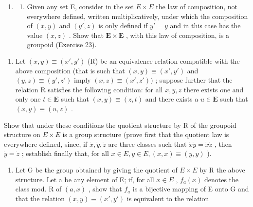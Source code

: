 \begin{enumerate}
\def\labelenumi{\arabic{enumi}.}
\setcounter{enumi}{23}
\tightlist
\item
  \begin{enumerate}
  \def\labelenumii{(\alph{enumii})}
  \tightlist
  \item
    Given any set E, consider in the set \(E \times E\) the law of composition, not everywhere defined, written multiplicatively, under which the composition of \((x, y)\) and \((y', z)\) is only defined if \(y' = y\) and in this case has the value \((x, z)\) . Show that \(\mathbf{E} \times \mathbf{E}\) , with this law of composition, is a groupoid (Exercise 23).
  \end{enumerate}
\end{enumerate}

\begin{enumerate}
\def\labelenumi{(\alph{enumi})}
\setcounter{enumi}{1}
\tightlist
\item
  Let \((x, y) \equiv (x', y')\) (R) be an equivalence relation compatible with the above composition (that is such that \((x, y) \equiv (x', y')\) and \((y, z) \equiv (y', z')\) imply \((x, z) \equiv (x', z'))\) ; suppose further that the relation R satisfies the following condition: for all \(x, y, z\) there exists one and only one \(t \in \mathbf{E}\) such that \((x, y) \equiv (z, t)\) and there exists a \(u \in \mathbf{E}\) such that \((x, y) \equiv (u, z)\) .
\end{enumerate}

Show that under these conditions the quotient structure by R of the groupoid structure on \(E \times E\) is a group structure (prove first that the quotient law is everywhere defined, since, if \(\dot{x}, \dot{y}, \dot{z}\) are three classes such that \(\dot{x}\dot{y} = \dot{x}\dot{z}\) , then \(\dot{y} = \dot{z}\) ; establish finally that, for all \(x \in E, y \in E, (x, x) \equiv (y, y)\) ).

\begin{enumerate}
\def\labelenumi{(\alph{enumi})}
\setcounter{enumi}{2}
\tightlist
\item
  Let G be the group obtained by giving the quotient of \(E \times E\) by R the above structure. Let a be any element of E; if, for all \(x \in E\) , \(f_{a}(x)\) denotes the class mod. R of \((a, x)\) , show that \(f_{a}\) is a bijective mapping of E onto G and that the relation \((x, y) \equiv (x', y')\) is equivalent to the relation
\end{enumerate}

